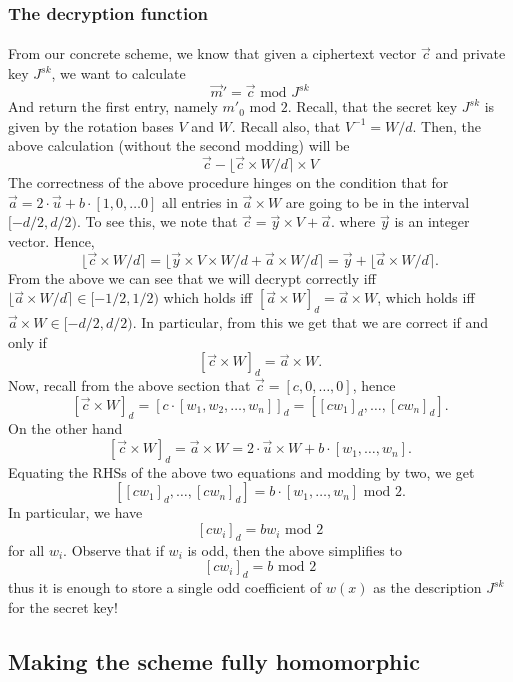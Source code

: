 \documentclass{article}
\theoremstyle{definition}
\theoremstyle{example}
\renewcommand{\mod}{\,\,\text{mod}\,\,}
\begin{document}
\subsubsection{The decryption function}
\paragraph{} From our concrete scheme, we know that given a ciphertext vector
$\vec{c}$ and private key $J^{sk}$, we want to calculate
\[
 \vec{m}' = \vec{c} \mod J^{sk}
\]
And return the first entry, namely $m'_0 \mod 2$.
Recall, that the secret key $J^{sk}$ is given by the rotation bases $V$ and $W$.
Recall also, that $V^{-1} = W/d$.
Then, the above calculation (without the second modding) will be
\[
  \vec{c} - \lfloor \vec{c} \times W/d \rceil \times V
\]
The correctness of the above procedure hinges on the condition that for $\vec{a}
= 2 \cdot \vec{u} + b \cdot [1, 0,\hdots 0]$ all entries in $\vec{a} \times
W$ are going to be in the interval $[-d/2, d/2)$. To see this, we note that
$\vec{c} = \vec{y} \times V + \vec{a}$. where $\vec{y}$ is an integer vector.
Hence,
\[
  \lfloor \vec{c} \times W/d \rceil = \lfloor \vec{y} \times V \times W/d +
  \vec{a} \times W/d \rceil = \vec{y} + \lfloor \vec{a} \times W/d \rceil.
\]
From the above we can see that we will decrypt correctly iff $\lfloor \vec{a}
\times W/d \rceil \in [-1/2, 1/2)$ which holds iff $[\vec{a} \times W]_d =
\vec{a} \times W$, which holds iff $\vec{a} \times W \in [-d/2, d/2)$. In
particular, from this we get that we are correct if and only if
\[
  [\vec{c} \times W]_d = \vec{a} \times W.
\]
Now, recall from the above section that $\vec{c} = [c, 0, \hdots, 0]$, hence
\[
  [\vec{c} \times W]_d = [c \cdot [w_1, w_2, \hdots, w_n]]_d = [[cw_1]_d,
  \hdots, [cw_n]_d].
\]
On the other hand
\[
  [\vec{c} \times W]_d = \vec{a} \times W = 2 \cdot \vec{u} \times W + b \cdot
  [w_1, \hdots, w_n].
\]
Equating the RHSs of the above two equations and modding by two, we get
\[
  [[cw_1]_d, \hdots, [cw_n]_d] = b \cdot [w_1, \hdots, w_n] \mod 2.
\]
In particular, we have
\[
  [cw_i]_d = bw_i \mod 2
\]
for all $w_i$. Observe that if $w_i$ is odd, then the above simplifies to
\[
  [cw_i]_d = b \mod 2
\]
thus it is enough to store a single odd coefficient of $w(x)$ as the description
$J^{sk}$ for the secret key!
\subsection{Making the scheme fully homomorphic}
\end{document}
